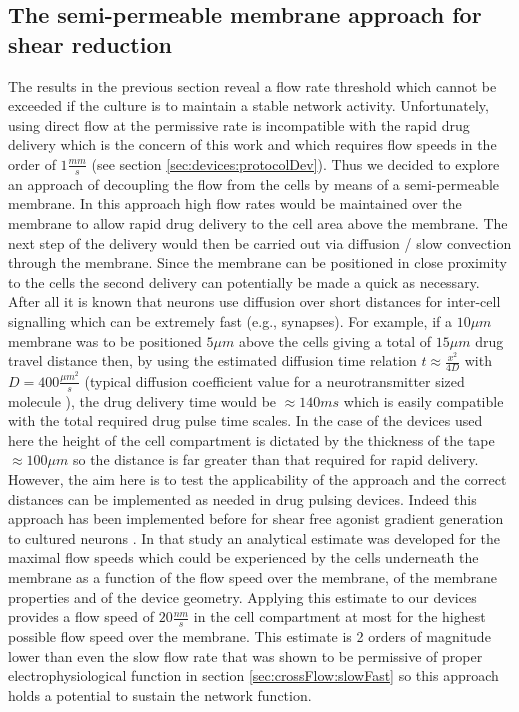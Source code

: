         \subsection{The semi-permeable membrane approach for shear reduction}
        \label{sec:crossFlow:membrane}
        The results in the previous section reveal a flow rate threshold which cannot be exceeded if the culture is to maintain a stable network activity. Unfortunately, using direct flow at the permissive rate is incompatible with the rapid drug delivery which is the concern of this work and which requires flow speeds in the order of \(1 \frac{mm}{s}\) (see section \ref{sec:devices:protocolDev}). Thus we decided to explore an approach of decoupling the flow from the cells by means of a semi-permeable membrane. In this approach high flow rates would be maintained over the membrane to allow rapid drug delivery to the cell area above the membrane. The next step of the delivery would then be carried out via diffusion / slow convection through the membrane. Since the membrane can be positioned in close proximity to the cells the second delivery can potentially be made a quick as necessary. After all it is known that neurons use diffusion over short distances for inter-cell signalling which can be extremely fast (e.g., synapses). For example, if a \(10 \mu m\) membrane was to be positioned \(5 \mu m\) above the cells giving a total of \(15 \mu m\) drug travel distance then, by using the estimated diffusion time relation \(t\approx \frac{x^2}{4D}\) with \(D=400\frac{\mu m^2}{s}\) (typical diffusion coefficient value for a neurotransmitter sized molecule \cite{johnstoneThesis}), the drug delivery time would be \(\approx 140 ms\) which is easily compatible with the total required drug pulse time scales. In the case of the devices used here the height of the cell compartment is dictated by the thickness of the tape \(\approx 100\mu m\) so the distance is far greater than that required for rapid delivery. However, the aim here is to test the applicability of the approach and the correct distances can be implemented as needed in drug pulsing devices. Indeed this approach has been implemented before for shear free agonist gradient generation to cultured neurons \cite{morel2012amplification,morel2012concentration}. In that study an analytical estimate was developed for the maximal flow speeds which could be experienced by the cells underneath the membrane as a function of the flow speed over the membrane, of the membrane properties and of the device geometry. Applying this estimate to our devices provides a flow speed of \(20 \frac{nm}{s}\) in the cell compartment at most for the highest possible flow speed over the membrane. This estimate is 2 orders of magnitude lower than even the slow flow rate that was shown to be permissive of proper electrophysiological function in section \ref{sec:crossFlow:slowFast} so this approach holds a potential to sustain the network function.

